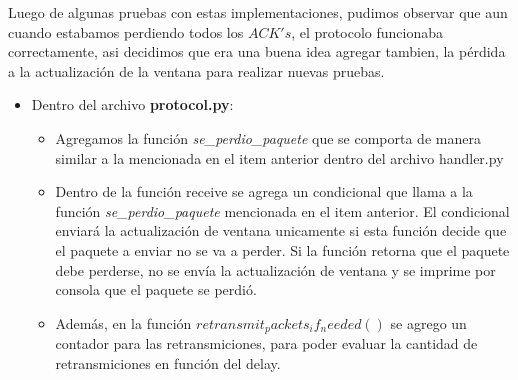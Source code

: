 Luego de algunas pruebas con estas implementaciones, pudimos observar que aun cuando estabamos perdiendo todos los $ACK's$, el protocolo funcionaba correctamente, asi decidimos que era una buena idea agregar tambien, la p\'erdida a la actualizaci\'on de la ventana para realizar nuevas pruebas.

\begin{itemize}

\item Dentro del archivo \textbf{protocol.py}:

\begin{itemize}

\item Agregamos la funci\'on \textit{se\_perdio\_paquete} que se comporta de manera similar a la mencionada en el item anterior dentro del archivo handler.py

\item Dentro de la función receive se agrega un condicional que llama a la funci\'on \textit{se\_perdio\_paquete} mencionada en el item anterior. El condicional enviar\'a la actualizaci\'on de ventana unicamente si esta funci\'on decide que el paquete a enviar no se va a perder. Si la funci\'on retorna que el paquete debe perderse, no se env\'ia la actualizaci\'on de ventana y se imprime por consola que el paquete se perdi\'o.

\item Adem\'as, en la funci\'on $retransmit_packets_if_needed()$ se agrego un contador para las retransmiciones, para poder evaluar la cantidad de retransmiciones en funci\'on del delay.

\end{itemize}

\end{itemize}
 